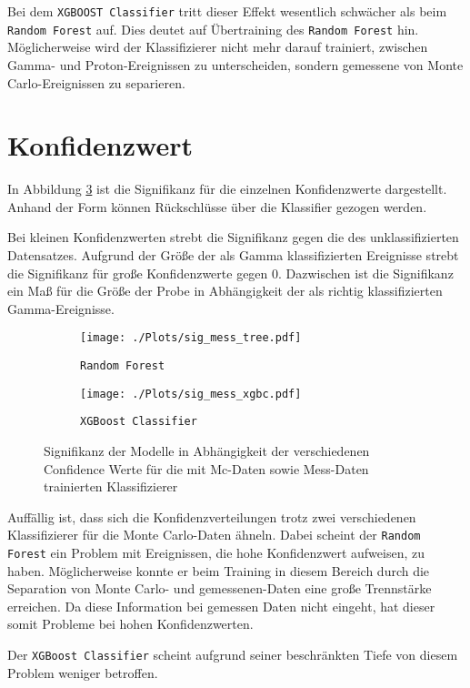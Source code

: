 Bei dem \texttt{XGBOOST Classifier} tritt dieser Effekt wesentlich schwächer als beim \texttt{Random Forest} auf. Dies deutet auf Übertraining des \texttt{Random Forest} hin. 
Möglicherweise wird der Klassifizierer nicht mehr darauf trainiert, zwischen Gamma- und Proton-Ereignissen zu unterscheiden, sondern gemessene von Monte Carlo-Ereignissen zu separieren.

\section{Konfidenzwert}
In Abbildung \ref{fig:signconf} ist die Signifikanz für die einzelnen Konfidenzwerte dargestellt. 
Anhand der Form können Rückschlüsse über die Klassifier gezogen werden. 

Bei kleinen Konfidenzwerten strebt die Signifikanz gegen die des unklassifizierten Datensatzes.
Aufgrund der Größe der als Gamma klassifizierten Ereignisse strebt die Signifikanz für große Konfidenzwerte gegen 0.
Dazwischen ist die Signifikanz ein Maß für die Größe der Probe in Abhängigkeit der als richtig klassifizierten Gamma-Ereignisse.
\begin{figure}[H]
  \centering
  \begin{subfigure}[b]{0.48\textwidth}
  \centering
  \texttt{[image: ./Plots/sig\_mess\_tree.pdf]}
  \caption{\texttt{Random Forest}}
  \label{fig:signconfMC}
\end{subfigure}
\begin{subfigure}[b]{0.48\textwidth}
  \centering
  \texttt{[image: ./Plots/sig\_mess\_xgbc.pdf]}
  \caption{\texttt{XGBoost Classifier}}
  \label{fig:signconfMESS}
\end{subfigure}
\caption{Signifikanz der Modelle in Abhängigkeit der verschiedenen Confidence Werte für die mit Mc-Daten sowie Mess-Daten trainierten Klassifizierer}
\label{fig:signconf}
\end{figure}

Auffällig ist, dass sich die Konfidenzverteilungen trotz zwei verschiedenen Klassifizierer für die Monte Carlo-Daten ähneln.
Dabei scheint der \texttt{Random Forest} ein Problem mit Ereignissen, die hohe Konfidenzwert aufweisen, zu haben. 
Möglicherweise konnte er beim Training in diesem Bereich durch die Separation von Monte Carlo- und gemessenen-Daten eine große Trennstärke erreichen. 
Da diese Information bei gemessen Daten nicht eingeht, hat dieser somit Probleme bei hohen Konfidenzwerten.

Der \texttt{XGBoost Classifier} scheint aufgrund seiner beschränkten Tiefe von diesem Problem weniger betroffen. 

